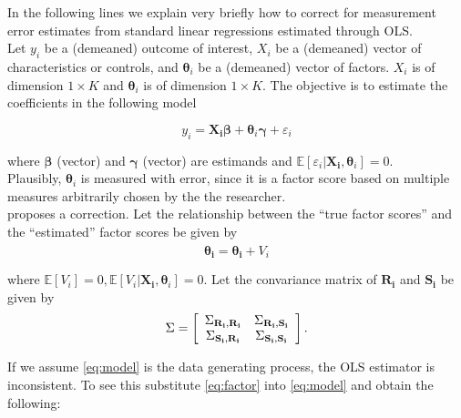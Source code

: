 \noindent In the following lines we explain very briefly how to correct for measurement error estimates from standard linear regressions estimated through OLS.\\

\indent Let $y_{i}$ be a (demeaned) outcome of interest, $X_{i}$ be a (demeaned) vector of characteristics or controls, and $\mathbf{\theta}_{i}$ be a (demeaned) vector of factors.  $X_{i}$ is of dimension $1 \times K$ and  $\mathbf{\theta}_{i}$ is of dimension $1 \times K$. The objective is to estimate the coefficients in the following model

\begin{equation}
y_{i} = \mathbf{X_{i}}  \mathbf{\beta} + \mathbf{\theta}_{i} \mathbf{\gamma} + \varepsilon_{i} \label{eq:model}
\end{equation}

\noindent where $\mathbf{\beta}$ (vector) and $\mathbf{\gamma}$ (vector) are estimands and $ \mathbb{E}[ \varepsilon_{i} | \mathbf{X_{i}}, \mathbf{\theta}_{i}] = 0$.\\ 
\indent Plausibly, $\mathbf{\theta}_{i}$ is measured with error, since it is a factor score based on multiple measures arbitrarily chosen by the the researcher.\\
\indent  \citet{croon2002using} proposes a correction. Let the relationship between the ``true factor scores'' and the ``estimated'' factor scores be given by
\begin{equation}
\hat{\mathbf{\theta_{i}}} = \mathbf{\theta_{i}} + V_{i} \label{eq:factor}
\end{equation}

\noindent where $\mathbb{E} \left[ V_{i} \right] = 0, \mathbb{E}[ V_{i} | \mathbf{X_{i}}, \mathbf{\theta}_{i}] = 0$. Let the convariance matrix of $\mathbf{R_{i}}$ and $\mathbf{S_{i}}$ be given by \begin{equation} 
\Sigma = \left[ \begin{array}{c c}
    \Sigma_{\mathbf{R_{i}}, \mathbf{R_{i}}} & \Sigma_{\mathbf{R_{i}}, \mathbf{S_{i}}} \\
    \Sigma_{\mathbf{S_{i}}, \mathbf{R_{i}}} &  \Sigma_{\mathbf{S_{i}}, \mathbf{S_{i}}} 
  \end{array}  \right].
\end{equation}

\indent If we assume \eqref{eq:model} is the data generating process, the OLS estimator is inconsistent. To see this substitute \eqref{eq:factor} into \eqref{eq:model} and obtain the following:

